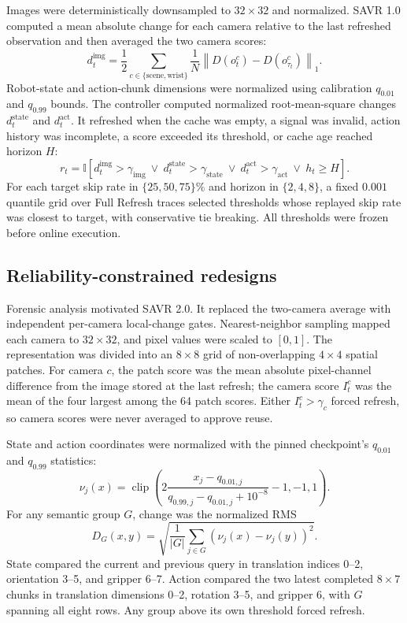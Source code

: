 \documentclass[11pt]{article}
\begin{document}
Images were deterministically downsampled to $32\times32$ and normalized. SAVR 1.0 computed a mean absolute change for each camera relative to the last refreshed observation and then averaged the two camera scores:
\begin{equation}
d_t^{\mathrm{img}}=\frac{1}{2}\sum_{c\in\{\mathrm{scene},\mathrm{wrist}\}}
\frac{1}{N}\left\|D(o_t^c)-D(o_{\tau_t}^c)\right\|_1.
\label{eq:image}
\end{equation}
Robot-state and action-chunk dimensions were normalized using calibration $q_{0.01}$ and $q_{0.99}$ bounds. The controller computed normalized root-mean-square changes $d_t^{\mathrm{state}}$ and $d_t^{\mathrm{act}}$. It refreshed when the cache was empty, a signal was invalid, action history was incomplete, a score exceeded its threshold, or cache age reached horizon $H$:
\begin{equation}
r_t=\mathbb{I}\left[
d_t^{\mathrm{img}}>\gamma_{\mathrm{img}}\ \vee\
d_t^{\mathrm{state}}>\gamma_{\mathrm{state}}\ \vee\
d_t^{\mathrm{act}}>\gamma_{\mathrm{act}}\ \vee\
h_t\ge H\right].
\label{eq:savr1}
\end{equation}
For each target skip rate in $\{25,50,75\}\%$ and horizon in $\{2,4,8\}$, a fixed $0.001$ quantile grid over Full Refresh traces selected thresholds whose replayed skip rate was closest to target, with conservative tie breaking. All thresholds were frozen before online execution.

\subsection{Reliability-constrained redesigns}

Forensic analysis motivated SAVR 2.0. It replaced the two-camera average with independent per-camera local-change gates. Nearest-neighbor sampling mapped each camera to $32\times32$, and pixel values were scaled to $[0,1]$. The representation was divided into an $8\times8$ grid of non-overlapping $4\times4$ spatial patches. For camera $c$, the patch score was the mean absolute pixel-channel difference from the image stored at the last refresh; the camera score $I_t^c$ was the mean of the four largest among the 64 patch scores. Either $I_t^c>\gamma_c$ forced refresh, so camera scores were never averaged to approve reuse.

State and action coordinates were normalized with the pinned checkpoint's $q_{0.01}$ and $q_{0.99}$ statistics:
\begin{equation}
\nu_j(x)=\operatorname{clip}\!\left(2\frac{x_j-q_{0.01,j}}{q_{0.99,j}-q_{0.01,j}+10^{-8}}-1,-1,1\right).
\label{eq:normalization}
\end{equation}
For any semantic group $G$, change was the normalized RMS
\begin{equation}
D_G(x,y)=\sqrt{\frac{1}{|G|}\sum_{j\in G}\left(\nu_j(x)-\nu_j(y)\right)^2}.
\label{eq:groupchange}
\end{equation}
State compared the current and previous query in translation indices 0--2, orientation 3--5, and gripper 6--7. Action compared the two latest completed $8\times7$ chunks in translation dimensions 0--2, rotation 3--5, and gripper 6, with $G$ spanning all eight rows. Any group above its own threshold forced refresh.
\end{document}
